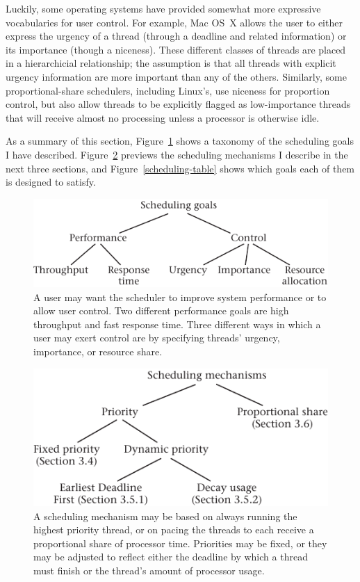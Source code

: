 Luckily, some operating systems have provided somewhat more expressive
vocabularies for user control.  For example, Mac OS~X allows the user
to either express the urgency of a thread (through a deadline and
related information) or its importance (though a niceness).  These
different classes of threads are placed in a hierarchicial
relationship; the assumption is that all threads with explicit urgency
information are more important than any of the others.  Similarly, some
proportional-share schedulers, including Linux's, use niceness for
proportion control, but also allow threads to be explicitly flagged as
low-importance threads that will receive almost no processing unless a processor is otherwise idle.

As a summary of this section, Figure~\ref{scan-3-6} shows a taxonomy
of the scheduling goals I have described.  Figure~\ref{scan-3-7}
previews the scheduling mechanisms I describe in the next three
sections, and Figure~\ref{scheduling-table} shows which goals each of
them is designed to satisfy.
\begin{figure}
\centerline{\includegraphics{hail_f0306}}
\caption{A user may want the scheduler to improve system
  performance or to allow user control.  Two different performance
  goals are high throughput and fast response time.  Three different
  ways in which a user may exert control are by specifying threads'
  urgency, importance, or resource share.}
\label{scan-3-6}
\end{figure}
\begin{figure}
\centerline{\includegraphics{hail_f0307}}
\caption{A scheduling mechanism may be based on always running the highest
  priority thread, or on pacing the threads to each receive a
  proportional share of processor time.  Priorities may be fixed, or
  they may be adjusted to reflect either the deadline by which a
  thread must finish or the thread's amount of processor usage.}
\label{scan-3-7}
\end{figure}
